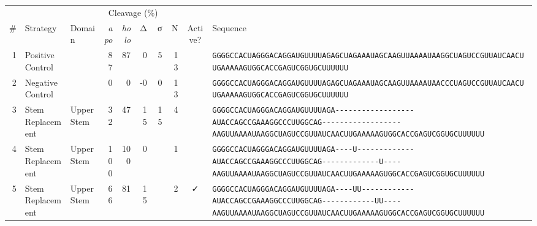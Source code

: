 \begin{tabular}{rllrrrrrcl}
\toprule

&
&
&
\multicolumn{4}{c}{Cleavage (\%)} &
&
&
\\
\cmidrule(r){4-7}

\# &
Strategy &
Domain &
\multicolumn{1}{r}{\textit{apo}} &
\multicolumn{1}{r}{\textit{holo}} &
\multicolumn{1}{r}{Δ} &
\multicolumn{1}{r}{σ} &
N &
Active? &
Sequence \\
\midrule

 1 & Positive Control &  & 87 & 87 & 0 & 5 & 13 &  &
 \color{ucsfdarkgrey}\verb|GGGGCCACUAGGGACAGGAU|\color{ucsforange}\verb|GUUUUA|\color{ucsfblue}\verb|GAGCUAGAAAUAGCAAGU|\color{ucsforange}\verb|UAAAAUAA|\color{ucsfnavy}\verb|GGCUAGUCC|\color{ucsforange}\verb|GUUAUCA|\color{ucsfteal}\verb|ACUUGAAAAAGU|\color{ucsforange}\verb|GGCACCGAGUCGGUGCUUUUUU| \\

 2 & Negative Control &  & 0 & 0 & -0 & 0 & 13 &  &
 \color{ucsfdarkgrey}\verb|GGGGCCACUAGGGACAGGAU|\color{ucsforange}\verb|GUUUUA|\color{ucsfblue}\verb|GAGCUAGAAAUAGCAAGU|\color{ucsforange}\verb|UAAAAUAA|\color{ucsfnavy}\verb|CCCUAGUCC|\color{ucsforange}\verb|GUUAUCA|\color{ucsfteal}\verb|ACUUGAAAAAGU|\color{ucsforange}\verb|GGCACCGAGUCGGUGCUUUUUU| \\

\midrule

 3 & Stem Replacement & Upper Stem & 32 & 47 & 15 & 15 & 4 &  &
 \color{ucsfdarkgrey}\verb|GGGGCCACUAGGGACAGGAU|\color{ucsforange}\verb|GUUUUA|\color{ucsfblue}\verb|GA------------------|\color{ucsfpurple}\verb|AUACCAGCCGAAAGGCCCUUGGCAG|\color{ucsfblue}\verb|------------------AAGU|\color{ucsforange}\verb|UAAAAUAA|\color{ucsfnavy}\verb|GGCUAGUCC|\color{ucsforange}\verb|GUUAUCA|\color{ucsfteal}\verb|ACUUGAAAAAGU|\color{ucsforange}\verb|GGCACCGAGUCGGUGCUUUUUU| \\

 4 & Stem Replacement & Upper Stem & 100 & 100 & 0 &  & 1 &  &
 \color{ucsfdarkgrey}\verb|GGGGCCACUAGGGACAGGAU|\color{ucsforange}\verb|GUUUUA|\color{ucsfblue}\verb|GA----U-------------|\color{ucsfpurple}\verb|AUACCAGCCGAAAGGCCCUUGGCAG|\color{ucsfblue}\verb|-------------U----AAGU|\color{ucsforange}\verb|UAAAAUAA|\color{ucsfnavy}\verb|GGCUAGUCC|\color{ucsforange}\verb|GUUAUCA|\color{ucsfteal}\verb|ACUUGAAAAAGU|\color{ucsforange}\verb|GGCACCGAGUCGGUGCUUUUUU| \\

 5 & Stem Replacement & Upper Stem & 66 & 81 & 15 &  & 2 & ✓ &
 \color{ucsfdarkgrey}\verb|GGGGCCACUAGGGACAGGAU|\color{ucsforange}\verb|GUUUUA|\color{ucsfblue}\verb|GA----UU------------|\color{ucsfpurple}\verb|AUACCAGCCGAAAGGCCCUUGGCAG|\color{ucsfblue}\verb|------------UU----AAGU|\color{ucsforange}\verb|UAAAAUAA|\color{ucsfnavy}\verb|GGCUAGUCC|\color{ucsforange}\verb|GUUAUCA|\color{ucsfteal}\verb|ACUUGAAAAAGU|\color{ucsforange}\verb|GGCACCGAGUCGGUGCUUUUUU| \\


\end{tabular}
